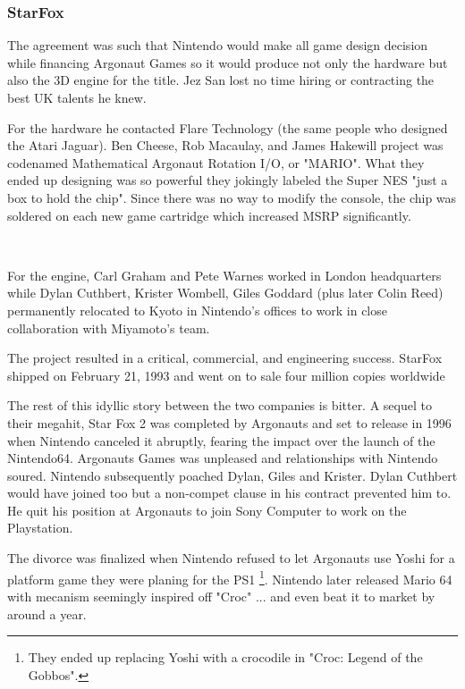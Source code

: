 \subsubsection{StarFox}
The agreement was such that Nintendo would make all game design decision while financing Argonaut Games so it would produce not only the hardware but also the 3D engine for the title. Jez San lost no time hiring or contracting the best UK talents he knew.\\
\par
For the hardware he contacted Flare Technology (the same people who designed the Atari Jaguar). Ben Cheese, Rob Macaulay, and James Hakewill project was codenamed Mathematical Argonaut Rotation I/O, or "MARIO". What they ended up designing was so powerful they jokingly labeled the Super NES "just a box to hold the chip". Since there was no way to modify the console, the chip was soldered on each new game cartridge which increased MSRP significantly.\\
\par
{}\\
\par
For the engine, Carl Graham and Pete Warnes worked in London headquarters while Dylan Cuthbert, Krister Wombell, Giles Goddard (plus later Colin Reed) permanently relocated to Kyoto in Nintendo's offices to work in close collaboration with Miyamoto's team.\\ 
\par
The project resulted in a critical, commercial, and engineering success. StarFox shipped on February 21, 1993 and went on to sale four million copies worldwide\\
 \par

The rest of this idyllic story between the two companies is bitter. A sequel to their megahit, Star Fox 2 was completed by Argonauts and set to release in 1996 when Nintendo canceled it abruptly, fearing the impact over the launch of the Nintendo64. Argonauts Games was unpleased and relationships with Nintendo soured. Nintendo subsequently poached Dylan, Giles and Krister. Dylan Cuthbert would have joined too but a non-compet clause in his contract prevented him to. He quit his position at Argonauts to join Sony Computer to work on the Playstation.\\
\par
The divorce was finalized when Nintendo refused to let Argonauts use Yoshi for a platform game they were planing for the PS1 \footnote{They ended up replacing Yoshi with a crocodile in "Croc: Legend of the Gobbos".}. Nintendo later released Mario 64 with mecanism seemingly inspired off "Croc" ... and even beat it to market by around a year.





